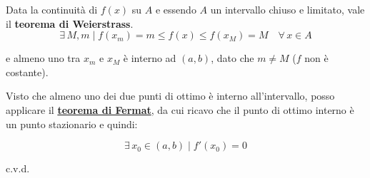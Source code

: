 \documentclass[../../dimostrazioni]{subfiles}
\begin{document}
            Data la continuità di \(f(x)\) su \(A\) e essendo \(A\) un intervallo chiuso e limitato, vale il \textbf{teorema di Weierstrass}.
            \[ \exists \, M, m \; | \; f(x_m)=m \leqslant f(x) \leqslant f(x_M) = M \quad \forall \, x \in A \]

            e almeno uno tra \(x_m\) e \(x_M\) è interno ad \( (a,b) \), dato che \( m \neq M \) (\( f \) non è costante).

            Visto che almeno uno dei due punti di ottimo è interno all'intervallo, posso applicare il \textbf{\hyperref[teoFermat]{teorema di Fermat}}, da cui ricavo che il punto di ottimo interno è un punto stazionario e quindi:

            \[\exists \, x_0 \in (a,b) \; | \; f'(x_0) = 0 \]
            
            c.v.d.

    
\end{document}
